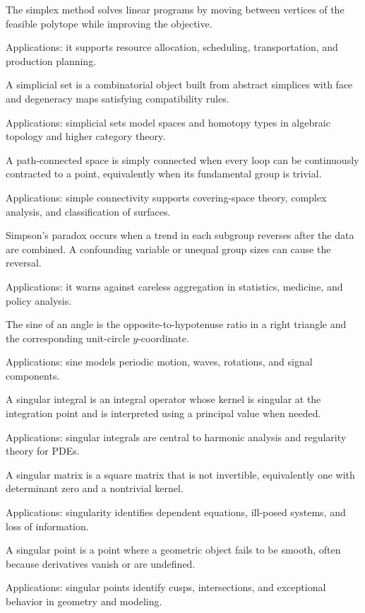 The simplex method solves linear programs by moving between vertices of the feasible polytope while improving the objective. \par\noindent Applications: it supports resource allocation, scheduling, transportation, and production planning.

A simplicial set is a combinatorial object built from abstract simplices with face and degeneracy maps satisfying compatibility rules. \par\noindent Applications: simplicial sets model spaces and homotopy types in algebraic topology and higher category theory.

A path-connected space is simply connected when every loop can be continuously contracted to a point, equivalently when its fundamental group is trivial. \par\noindent Applications: simple connectivity supports covering-space theory, complex analysis, and classification of surfaces.

Simpson's paradox occurs when a trend in each subgroup reverses after the data are combined. A confounding variable or unequal group sizes can cause the reversal. \par\noindent Applications: it warns against careless aggregation in statistics, medicine, and policy analysis.

The sine of an angle is the opposite-to-hypotenuse ratio in a right triangle and the corresponding unit-circle $y$-coordinate. \par\noindent Applications: sine models periodic motion, waves, rotations, and signal components.

A singular integral is an integral operator whose kernel is singular at the integration point and is interpreted using a principal value when needed. \par\noindent Applications: singular integrals are central to harmonic analysis and regularity theory for PDEs.

A singular matrix is a square matrix that is not invertible, equivalently one with determinant zero and a nontrivial kernel. \par\noindent Applications: singularity identifies dependent equations, ill-posed systems, and loss of information.

A singular point is a point where a geometric object fails to be smooth, often because derivatives vanish or are undefined. \par\noindent Applications: singular points identify cusps, intersections, and exceptional behavior in geometry and modeling.

